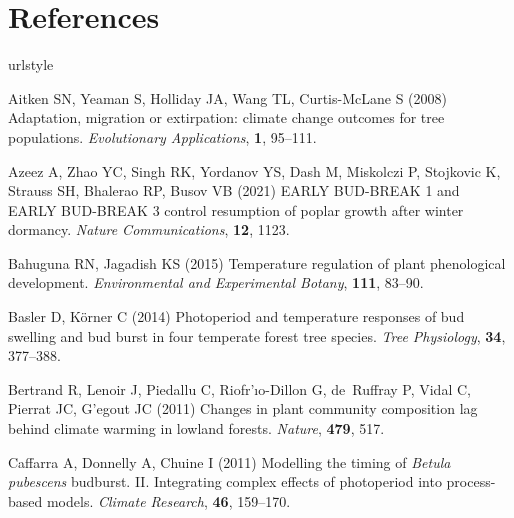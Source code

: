 \documentclass[11pt,letter]{article}
\begin{document}
\section{References}
\begin{thebibliography}{63}
\providecommand{\natexlab}[1]{#1}
\providecommand{\url}[1]{\texttt{#1}}
\providecommand{\urlprefix}{URL }
\expandafter\ifx\csname urlstyle\endcsname\relax
  \providecommand{\doi}[1]{doi:\discretionary{}{}{}#1}\else
  \providecommand{\doi}{doi:\discretionary{}{}{}\begingroup
  \urlstyle{rm}\Url}\fi

Aitken SN, Yeaman S, Holliday JA, Wang TL, Curtis-McLane S (2008) Adaptation,
  migration or extirpation: climate change outcomes for tree populations.
\newblock \emph{Evolutionary Applications}, \textbf{1}, 95--111.

Azeez A, Zhao YC, Singh RK, Yordanov YS, Dash M, Miskolczi P, Stojkovic K,
  Strauss SH, Bhalerao RP, Busov VB (2021) {EARLY BUD-BREAK 1 and EARLY
  BUD-BREAK 3 control resumption of poplar growth after winter dormancy}.
\newblock \emph{Nature Communications}, \textbf{12}, 1123.

Bahuguna RN, Jagadish KS (2015) Temperature regulation of plant phenological
  development.
\newblock \emph{Environmental and Experimental Botany}, \textbf{111}, 83--90.

Basler D, K{\"o}rner C (2014) Photoperiod and temperature responses of bud
  swelling and bud burst in four temperate forest tree species.
\newblock \emph{Tree Physiology}, \textbf{34}, 377--388.

Bertrand R, Lenoir J, Piedallu C, Riofr{'\i}o-Dillon G, de~Ruffray P, Vidal C,
  Pierrat JC, G{'e}gout JC (2011) Changes in plant community composition lag
  behind climate warming in lowland forests.
\newblock \emph{Nature}, \textbf{479}, 517.

Caffarra A, Donnelly A, Chuine I (2011) {Modelling the timing of \emph{Betula
  pubescens} budburst. II. Integrating complex effects of photoperiod into
  process-based models}.
\newblock \emph{Climate Research}, \textbf{46}, 159--170.


\end{thebibliography}
\end{document}
